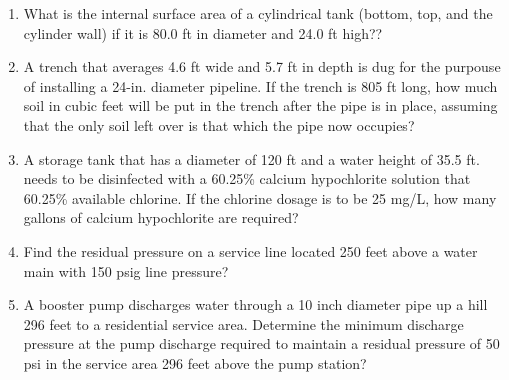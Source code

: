 \documentclass{article}
\begin{document}
 


\begin{enumerate}

\item What is the internal surface area of a cylindrical tank (bottom, top, and the
cylinder wall) if it is 80.0 ft in diameter and 24.0 ft high??\\
\vspace{0.3cm}

\vspace{6cm}


\item A trench that averages 4.6 ft wide and 5.7 ft in depth is dug for the purpouse of
installing a 24-in. diameter pipeline. If the trench is 805 ft long, how much soil in
cubic feet will be put in the trench after the pipe is in place, assuming that the
only soil left over is that which the pipe now occupies?
\vspace{6cm}


\item A storage tank that has a diameter of 120 ft and a water height of 35.5 ft. needs to be disinfected with a 60.25\% calcium hypochlorite solution that 60.25\% available chlorine. If the chlorine dosage is to be 25 mg/L, how many gallons of calcium hypochlorite are required?

\newpage
\item Find the residual pressure on a service line located 250 feet above a water main with 150 psig line pressure?

\vspace{6cm}
\item A booster pump discharges water through a 10 inch diameter pipe up a hill 296 feet to a residential service area. Determine the minimum discharge pressure at the pump discharge required to maintain a residual pressure of 50 psi in the service area 296 feet above the pump station?

\end{enumerate}
\end{document}
